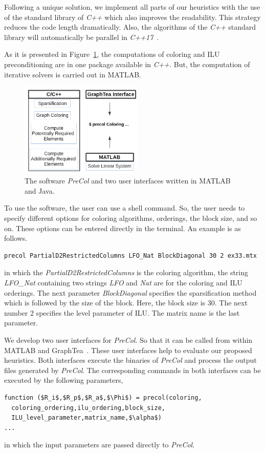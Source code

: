 \documentclass[12pt, twoside,a4paper,toc=bibliography]{scrbook}
\newcommand{\figref}[1]{Figure~\protect\ref{#1}}
\begin{document}
Following a unique solution, we implement all parts of our heuristics
with the use of the standard library of \textit{C++} which also improves the readability.
This strategy reduces the code length dramatically.
Also, the algorithms of the \textit{C++} standard library will automatically be parallel in \textit{C++17}~\cite{parallelcpp}.

As it is presented in \figref{f.structure}, the computations of coloring and ILU preconditioning
are in one package available in \textit{C++}. But, the computation of iterative solvers is carried out
in MATLAB.
\begin{figure}
\centering
\includegraphics[width=0.52\textwidth]{new_struct}
\caption{
The software \textit{PreCol} and two user interfaces written in MATLAB and Java.}
\label{f.structure}
\end{figure}

To use the software, the user can use a shell command.
So, the user needs to specify different
options for coloring algorithms, orderings, the block size, and so on.
These options can be entered directly in the terminal.
An example is as follows.
\begin{lstlisting}
precol PartialD2RestrictedColumns LFO_Nat BlockDiagonal 30 2 ex33.mtx
\end{lstlisting}
in which the \textit{PartialD2RestrictedColumns} is the coloring algorithm,
the string \textit{LFO\_Nat} containing
two strings \textit{LFO} and \textit{Nat} are for the coloring and ILU orderings.
The next parameter \textit{BlockDiagonal} specifies the sparsification method
which is followed by the size of the block. Here, the block size is $30$.
The next number $2$ specifies the level parameter of ILU.
The matrix name is the last parameter.

We develop two user interfaces for \textit{PreCol}.
So that it can be called from within MATLAB and GraphTea~\cite{2014:07,2014:15}.
These user interfaces help to evaluate our proposed heuristics.
Both interfaces execute the binaries of \textit{PreCol}
and process the output files generated by \textit{PreCol}.
The corresponding commands in both interfaces can be executed by the following parameters,
\begin{lstlisting}[mathescape]
function ($R_i$,$R_p$,$R_a$,$\Phi$) = precol(coloring,
  coloring_ordering,ilu_ordering,block_size,
  ILU_level_parameter,matrix_name,$\alpha$)
...
\end{lstlisting}
in which the input parameters are passed directly to \textit{PreCol}.
\end{document}
